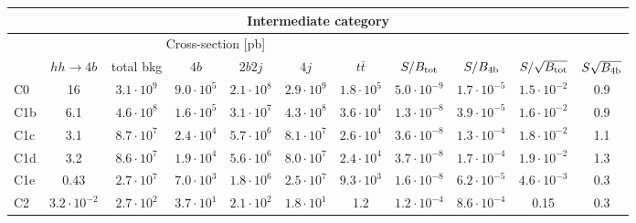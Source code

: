 \begin{tabular}{|l|cc|cccc|cccc|}
  \hline
\multicolumn{11}{|c|}{Intermediate category}\\
\hline
&  \multicolumn{6}{c|}{Cross-section [pb]} &  &  & &  \\
   &  $hh\to 4b$ &  total bkg  &   $4b$    &  $2b2j$   &   $4j$    &
$t\bar{t}$ &
$S/B_{\rm tot}$ & $S/B_{\rm 4b}$ & $S/\sqrt{B_{\rm tot}}$ & $S\sqrt{B_{\rm 4b}}$ \\
  \hline
  \hline
C0      & 16  &   $3.1\cdot 10^9$   & $9.0\cdot 10^5$ &  $2.1\cdot 10^8$ & $2.9\cdot 10^9$ & $1.8\cdot 10^5$ &   $5.0\cdot 10^{-9}$   & $1.7\cdot 10^{-5}$ &    $1.5\cdot 10^{-2}$   & 0.9\\
 C1b     & 6.1  &  $ 4.6\cdot 10^8$   &$ 1.6\cdot 10^5$ & $3.1\cdot 10^7$ & $4.3\cdot 10^8$ & $3.6\cdot 10^4$  &  $ 1.3\cdot 10^{-8}$   & $3.9\cdot 10^{-5}$  & $1.6\cdot 10^{-2}$   & 0.9 \\
 C1c     & 3.1  &   $8.7\cdot 10^7 $  & $2.4\cdot 10^4$ & $5.7\cdot 10^6$ & $8.1\cdot 10^7$ & $2.6\cdot 10^4$ &   $3.6\cdot 10^{-8}$   & $1.3\cdot 10^{-4}$ &  $1.8\cdot 10^{-2}$    & 1.1 \\ 
 C1d     & 3.2  &   $8.6\cdot 10^7 $  & $1.9\cdot 10^4$ & $5.6\cdot 10^6$ & $8.0\cdot 10^7$ & $2.4\cdot 10^4$  &   $3.7\cdot 10^{-8}$   & $1.7\cdot 10^{-4}$ &   $1.9\cdot 10^{-2}$   & 1.3 \\
 C1e     & 0.43  &   $2.7\cdot 10^7$   & $7.0\cdot 10^3$ & $1.8\cdot 10^6$ & $2.5\cdot 10^7$ & $9.3\cdot 10^3$  &   $1.6\cdot 10^{-8}$   & $6.2\cdot 10^{-5}$  &     $4.6\cdot 10^{-3}$   & 0.3 \\
 C2      & $3.2\cdot 10^{-2}$  &   $2.7\cdot 10^2$   & $3.7\cdot 10^1$ & $2.1\cdot 10^2$ & $1.8\cdot 10^1$ & 1.2 &  $ 1.2\cdot 10^{-4}$   & $8.6\cdot 10^{-4}$  &      0.15   & 0.3 \\
\hline
\end{tabular}
